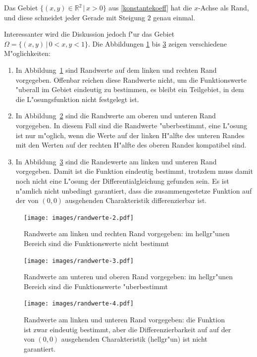 Das Gebiet $\{(x,y)\in\mathbb R^2\,|\, x >0\}$  aus \ref{konstantekoeff}
hat die $x$-Achse als Rand, und diese schneidet jeder Gerade mit Steigung
$2$ genau einmal.

Interessanter wird die Diskussion jedoch f"ur das Gebiet
$\Omega=\{(x,y)\,|\,0<x,y<1\}$. Die Abbildungen \ref{geometrie:charrand1}
bis \ref{geometrie:charrand3} zeigen verschiedene M"oglichkeiten:
\begin{enumerate}
\item
In Abbildung~\ref{geometrie:charrand1} sind Randwerte auf dem linken
und rechten Rand vorgegeben. Offenbar reichen diese Randwerte nicht, um
die Funktionswerte "uberall im Gebiet eindeutig zu bestimmen, es bleibt
ein Teilgebiet, in dem die L"osungsfunktion nicht festgelegt ist.
\item
In Abbildung~\ref{geometrie:charrand2}
sind die Randwerte am oberen und unteren Rand vorgegeben.
In diesem Fall sind die Randwerte "uberbestimmt, eine L"osung ist
nur m"oglich, wenn die Werte auf der linken H"alfte des unteren
Randes mit den Werten auf der rechten H"alfte des oberen Randes
kompatibel sind.
\item
In Abbildung~\ref{geometrie:charrand3}
sind die Randewerte am linken und unteren Rand vorgegeben.
Damit ist die Funktion eindeutig bestimmt, trotzdem
muss damit noch nicht eine L"osung der Differentialgleichung
gefunden sein.
Es ist n"amlich nicht unbedingt garantiert, dass die zusammengestetze
Funktion 
auf der von $(0,0)$ ausgehenden Charakteristik differenzierbar ist.
\end{enumerate}

\begin{figure}
\begin{center}
\texttt{[image: images/randwerte-2.pdf]}
\end{center}
\caption{Randwerte am linken und rechten Rand vorgegeben: im hellgr"unen
Bereich sind die Funktionswerte nicht bestimmt \label{geometrie:charrand1}}
\end{figure}

\begin{figure}
\begin{center}
\texttt{[image: images/randwerte-3.pdf]}
\end{center}
\caption{Randwerte am unteren und oberen Rand vorgegeben: im hellgr"unen
Bereich sind die Funktionswerte "uberbestimmt \label{geometrie:charrand2}}
\end{figure}

\begin{figure}
\begin{center}
\texttt{[image: images/randwerte-4.pdf]}
\end{center}
\caption{Randwerte am linken und unteren Rand vorgegeben: die Funktion
ist zwar eindeutig bestimmt, aber die Differenzierbarkeit auf auf
der von $(0,0)$ ausgehenden Charakteristik (hellgr"un) ist nicht garantiert.
\label{geometrie:charrand3}}
\end{figure}

